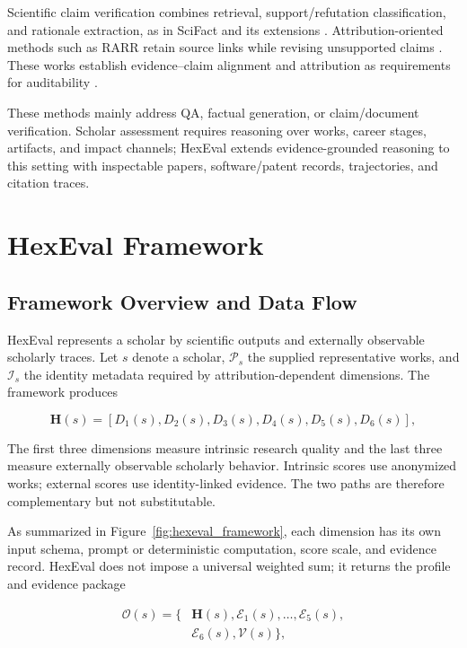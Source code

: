 \documentclass[letterpaper]{article} %
\begin{document}
Scientific claim verification combines retrieval, support/refutation classification, and rationale extraction, as in SciFact and its extensions \cite{wadden2020fact,wadden-etal-2022-scifact}. Attribution-oriented methods such as RARR retain source links while revising unsupported claims \cite{gao2023rarr}. These works establish evidence--claim alignment and attribution as requirements for auditability \cite{jacovi2020faithfully}.

These methods mainly address QA, factual generation, or claim/document verification. Scholar assessment requires reasoning over works, career stages, artifacts, and impact channels; HexEval extends evidence-grounded reasoning to this setting with inspectable papers, software/patent records, trajectories, and citation traces.

\section{HexEval Framework}
\label{sec:framework}

\subsection{Framework Overview and Data Flow}

HexEval represents a scholar by scientific outputs and externally observable scholarly traces. Let $s$ denote a scholar, $\mathcal{P}_s$ the supplied representative works, and $\mathcal{I}_s$ the identity metadata required by attribution-dependent dimensions. The framework produces

\begin{equation}
\mathbf{H}(s)=
\left[D_1(s),D_2(s),D_3(s),D_4(s),D_5(s),D_6(s)\right],
\end{equation}

The first three dimensions measure intrinsic research quality and the last three measure externally observable scholarly behavior. Intrinsic scores use anonymized works; external scores use identity-linked evidence. The two paths are therefore complementary but not substitutable.

As summarized in Figure~\ref{fig:hexeval_framework}, each dimension has its own input schema, prompt or deterministic computation, score scale, and evidence record. HexEval does not impose a universal weighted sum; it returns the profile and evidence package

\begin{equation}
\begin{aligned}
\mathcal{O}(s)=\{&\mathbf{H}(s),\mathcal{E}_1(s),\ldots,\mathcal{E}_5(s),\\
&\mathcal{E}_6(s),\mathcal{V}(s)\},
\end{aligned}
\end{equation}
\end{document}
